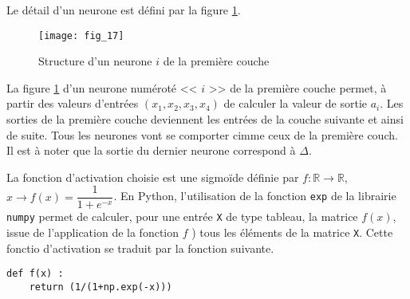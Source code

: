 Le détail d'un neurone est défini par la figure \ref{Cy_07_ch_02_td_01_fig_17}.

\begin{figure}[!h]
\centering
\texttt{[image: fig\_17]}
\caption{Structure d'un neurone $i$ de la première couche\label{Cy_07_ch_02_td_01_fig_17}}
\end{figure}

La figure \ref{Cy_07_ch_02_td_01_fig_17} d'un neurone numéroté << $i$ >> de la première couche permet, à partir des valeurs d'entrées $\left(x_1, x_2, x_3, x_4 \right)$ de calculer la valeur de sortie $a_i$. Les sorties de la première couche deviennent les entrées de la couche suivante et ainsi de suite. Tous les neurones vont se comporter cimme ceux de la première couch. Il est à noter que la sortie du dernier neurone correspond à $\Delta$.




La fonction d'activation choisie est une sigmoïde définie par $f: \mathbb{R} \to \mathbb{R}$, $x\to f(x) = \dfrac{1}{1+e^{-x}}$. En Python, l'utilisation de la fonction \lstinline{exp} de la librairie \lstinline{numpy} permet de calculer, pour une entrée \lstinline{X} de type tableau, la matrice $f(x)$, issue de l'application de la fonction $f$ ) tous les éléments de la matrice \lstinline{X}. Cette fonctio d'activation se traduit par la fonction suivante.
\begin{lstlisting}
def f(x) :
    return (1/(1+np.exp(-x)))
\end{lstlisting}


\ifprof
\begin{corrige}
\end{corrige}
\else
\fi


